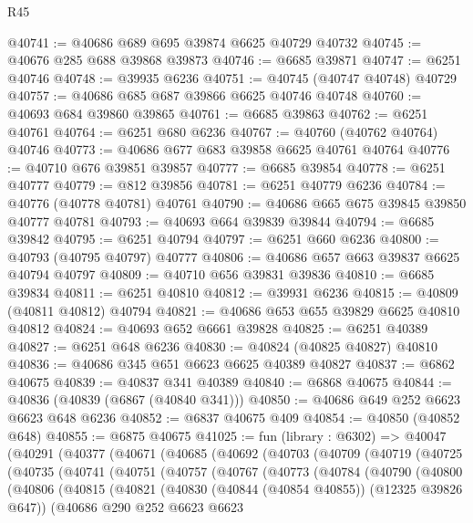 \begin{lexlean}{R45}
\begin{coremodule}
{@40741 := @40686 @689 @695 @39874 @6625 @40729 @40732
@40745 := @40676 @285 @688 @39868 @39873
@40746 := @6685 @39871
@40747 := @6251 @40746
@40748 := @39935 @6236
@40751 := @40745 (@40747 @40748) @40729
@40757 := @40686 @685 @687 @39866 @6625 @40746 @40748
@40760 := @40693 @684 @39860 @39865
@40761 := @6685 @39863
@40762 := @6251 @40761
@40764 := @6251 @680 @6236
@40767 := @40760 (@40762 @40764) @40746
@40773 := @40686 @677 @683 @39858 @6625 @40761 @40764
@40776 := @40710 @676 @39851 @39857
@40777 := @6685 @39854
@40778 := @6251 @40777
@40779 := @812 @39856
@40781 := @6251 @40779 @6236
@40784 := @40776 (@40778 @40781) @40761
@40790 := @40686 @665 @675 @39845 @39850 @40777 @40781
@40793 := @40693 @664 @39839 @39844
@40794 := @6685 @39842
@40795 := @6251 @40794
@40797 := @6251 @660 @6236
@40800 := @40793 (@40795 @40797) @40777
@40806 := @40686 @657 @663 @39837 @6625 @40794 @40797
@40809 := @40710 @656 @39831 @39836
@40810 := @6685 @39834
@40811 := @6251 @40810
@40812 := @39931 @6236
@40815 := @40809 (@40811 @40812) @40794
@40821 := @40686 @653 @655 @39829 @6625 @40810 @40812
@40824 := @40693 @652 @6661 @39828
@40825 := @6251 @40389
@40827 := @6251 @648 @6236
@40830 := @40824 (@40825 @40827) @40810
@40836 := @40686 @345 @651 @6623 @6625 @40389 @40827
@40837 := @6862 @40675
@40839 := @40837 @341 @40389
@40840 := @6868 @40675
@40844 := @40836 (@40839 (@6867 (@40840 @341)))
@40850 := @40686 @649 @252 @6623 @6623 @648 @6236
@40852 := @6837 @40675 @409
@40854 := @40850 (@40852 @648)
@40855 := @6875 @40675
@41025 := fun (library : @6302) =>
  @40047
    (@40291
      (@40377
        (@40671
          (@40685
            (@40692
              (@40703
                (@40709
                  (@40719
                    (@40725
                      (@40735
                        (@40741
                          (@40751
                            (@40757
                              (@40767
                                (@40773
                                  (@40784
                                    (@40790
                                      (@40800
                                        (@40806
                                          (@40815
                                            (@40821
                                              (@40830 (@40844 (@40854 @40855)) (@12325 @39826 @647))
                                              (@40686
                                                @290
                                                @252
                                                @6623
                                                @6623
}
\end{coremodule}
\end{lexlean}
